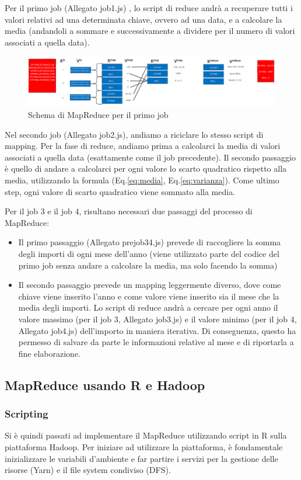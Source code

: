 Per il primo job (Allegato job1.js) , lo script di reduce andrà a recuperare tutti i valori relativi ad una determinata chiave, ovvero ad una data, e a calcolare la media (andandoli a sommare e successivamente a dividere per il numero di valori associati a quella data).
\begin{figure}[H]
    \centering
    \includegraphics[scale=.15]{img/mapReduceScheme.png}
    \caption{Schema di MapReduce per il primo job}
    \label{figure:mapReduceJob1}
\end{figure}
Nel secondo job (Allegato job2.js), andiamo a riciclare lo stesso script di mapping. Per la fase di reduce, andiamo prima a calcolarci la media di valori associati a quella data (esattamente come il job precedente). Il secondo passaggio è quello di andare a calcolarci per ogni valore lo scarto quadratico rispetto alla media, utilizzando la formula (Eq.\ref{eq:media}, Eq.\ref{eq:varianza}). Come ultimo step, ogni valore di scarto quadratico viene sommato alla media.

Per il job 3 e il job 4, risultano necessari due passaggi del processo di MapReduce:
\begin{itemize}
    \item Il primo passaggio (Allegato prejob34.js) prevede di raccogliere la somma degli importi di ogni mese dell'anno (viene utilizzato parte del codice del primo job senza andare a calcolare la media, ma solo facendo la somma)
    \item Il secondo passaggio prevede un mapping leggermente diverso, dove come chiave viene inserito l'anno e come valore viene inserito sia il mese che la media degli importi. Lo script di reduce andrà a cercare per ogni anno il valore massimo (per il job 3, Allegato job3.js) e il valore minimo (per il job 4, Allegato job4.js) dell'importo in maniera iterativa. Di conseguenza, questo ha permesso di salvare da parte le informazioni relative al mese e di riportarla a fine elaborazione.
\end{itemize}
\subsection{MapReduce usando R e Hadoop}
\subsubsection{Scripting}
Si è quindi passati ad implementare il MapReduce utilizzando script in R sulla piattaforma Hadoop. Per iniziare ad utilizzare la piattaforma, è fondamentale inizializzare le variabili d'ambiente e far partire i servizi per la gestione delle risorse (Yarn) e il file system condiviso (DFS).


